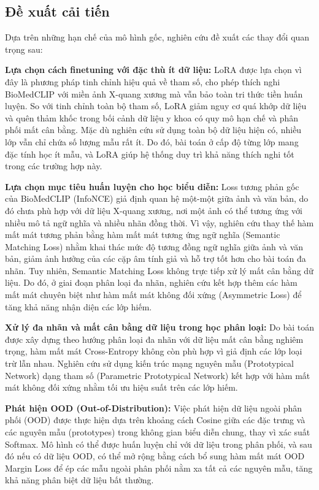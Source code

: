 \subsection{Đề xuất cải tiến}
Dựa trên những hạn chế của mô hình gốc, nghiên cứu đề xuất các thay đổi quan trọng sau:

\textbf{Lựa chọn cách finetuning với đặc thù ít dữ liệu:}
LoRA được lựa chọn vì đây là phương pháp tinh chỉnh hiệu quả về tham số, cho phép thích nghi BioMedCLIP với miền ảnh X-quang xương 
mà vẫn bảo toàn tri thức tiền huấn luyện. So với tinh chỉnh toàn bộ tham số, LoRA giảm nguy cơ quá khớp dữ liệu và quên thảm khốc 
trong bối cảnh dữ liệu y khoa có quy mô hạn chế và phân phối mất cân bằng.
Mặc dù nghiên cứu sử dụng toàn bộ dữ liệu hiện có, nhiều lớp vẫn chỉ chứa số lượng mẫu rất ít. 
Do đó, bài toán ở cấp độ từng lớp mang đặc tính học ít mẫu, và LoRA giúp hệ thống duy trì khả năng thích nghi tốt trong các trường hợp 
này.

\textbf{Lựa chọn mục tiêu huấn luyện cho học biểu diễn:}
Loss tương phản gốc của BioMedCLIP (InfoNCE) giả định quan hệ một-một giữa ảnh và văn bản, 
do đó chưa phù hợp với dữ liệu X-quang xương, nơi một ảnh có thể tương ứng với nhiều mô tả ngữ nghĩa và nhiều nhãn đồng thời.
Vì vậy, nghiên cứu thay thế hàm mất mát tương phản bằng hàm mất mát tương ứng ngữ nghĩa (Semantic Matching Loss) 
nhằm khai thác mức độ tương đồng ngữ nghĩa 
giữa ảnh và văn bản, giảm ảnh hưởng của các cặp âm tính giả và hỗ trợ tốt hơn cho bài toán đa nhãn. 
Tuy nhiên, Semantic Matching Loss không trực tiếp xử lý mất cân bằng dữ liệu. Do đó, ở giai đoạn phân loại đa nhãn, 
nghiên cứu kết hợp thêm các hàm mất mát chuyên biệt như hàm mất mát không đối xứng (Asymmetric Loss) 
để tăng khả năng nhận diện các lớp hiếm.

\textbf{Xử lý đa nhãn và mất cân bằng dữ liệu trong học phân loại:}
Do bài toán được xây dựng theo hướng phân loại đa nhãn với dữ liệu mất cân bằng nghiêm trọng, 
hàm mất mát Cross-Entropy không còn phù hợp vì giả định các lớp loại trừ lẫn nhau. 
Nghiên cứu sử dụng kiến trúc mạng nguyên mẫu (Prototypical Network) dạng tham số (Parametric Prototypical Network) 
kết hợp với hàm mất mát không đối xứng nhằm tối ưu hiệu suất trên các lớp hiếm.

\textbf{Phát hiện OOD (Out-of-Distribution):}
Việc phát hiện dữ liệu ngoài phân phối (OOD) được thực hiện dựa trên khoảng cách Cosine giữa các đặc trưng và các nguyên mẫu (prototypes) trong không gian biểu diễn chung,
thay vì xác suất Softmax. Mô hình có thể được huấn luyện chỉ với dữ liệu trong phân phối, và sau đó nếu có dữ liệu OOD, 
có thể mở rộng bằng cách bổ sung hàm mất mát OOD Margin Loss để ép các mẫu ngoài phân phối nằm xa tất cả các nguyên mẫu, 
tăng khả năng phân biệt dữ liệu bất thường.

